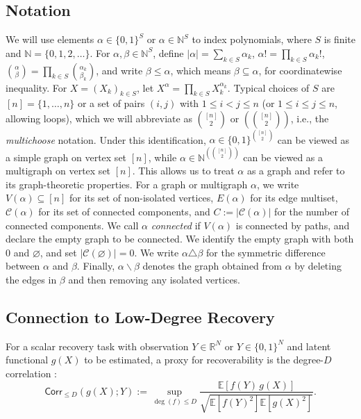 \documentclass[11pt, letterpaper]{article}
\numberwithin{equation}{section}
\newcommand{\Corr}{\mathsf{Corr}}
\begin{document}
\subsection{Notation}
We will use elements $\alpha\in\{0,1\}^S$ or
$\alpha\in\mathbb N^S$ to index polynomials, where $S$ is finite and
$\mathbb N=\{0,1,2,\ldots\}$. For $\alpha,\beta\in\mathbb N^S$, define $|\alpha|=\sum_{k\in S}\alpha_k$,
$\alpha!=\prod_{k\in S}\alpha_k!$,
$\binom{\alpha}{\beta}=\prod_{k\in S}\binom{\alpha_k}{\beta_k}$,
and write $\beta\le \alpha$, which means $\beta \subseteq \alpha$, for coordinatewise inequality. For $X=(X_k)_{k\in S}$, let $X^\alpha=\prod_{k\in S}X_k^{\alpha_k}$. Typical choices of $S$ are $[n]=\{1,\dots,n\}$ or a set of pairs $(i,j)$
with $1\le i<j\le n$ (or $1\le i\le j\le n$, allowing loops), which we will abbreviate as $\binom{[n]}{2}$ or $\left(\!\!\binom{[n]}{2}\!\!\right)$, i.e., the \emph{multichoose} notation. Under this
identification, $\alpha\in\{0,1\}^{\binom{[n]}{2}}$ can be viewed as a simple graph on vertex set $[n]$, while
$\alpha\in\mathbb N^{\left(\!\!\binom{[n]}{2}\!\!\right)}$ can be viewed as a multigraph on vertex set $[n]$. This allows us to treat $\alpha$ as a graph and refer to its graph-theoretic properties.
For a graph or multigraph $\alpha$, we write $V(\alpha)\subseteq[n]$ for
its set of non-isolated vertices, $E(\alpha)$ for its edge multiset,
$\mathcal{C}(\alpha)$ for its set of connected components, and $C:=|\mathcal{C}(\alpha)|$ for the number of connected components.
We call $\alpha$ \emph{connected} if $V(\alpha)$ is connected by paths, and
declare the empty graph to be connected. We identify the empty graph with
both $0$ and $\varnothing$, and set $|\mathcal C(\varnothing)|=0$. We write
$\alpha\triangle\beta$ for the symmetric difference between $\alpha$ and $\beta$. Finally,
$\alpha\backslash\beta$ denotes the graph obtained from $\alpha$ by deleting
the edges in $\beta$ and then removing any isolated vertices.

\subsection{Connection to Low-Degree Recovery}\label{sec:setup-recovery-testing}
For a scalar recovery task with observation $Y \in \mathbb{R}^N$ or $Y\in \{0,1\}^N$ and latent functional $g(X)$ to be estimated, a proxy for recoverability is the degree-$D$ correlation \cite{schramm2022computational}:
\begin{equation*}\label{eq:corr_def}
\Corr_{\le D}(g(X);Y) := \sup_{\deg(f)\le D} \frac{\mathbb{E}[f(Y)\,g(X)]}{\sqrt{\mathbb{E}[f(Y)^2]\mathbb{E}[g(X)^2]}}.
\end{equation*}
\end{document}
